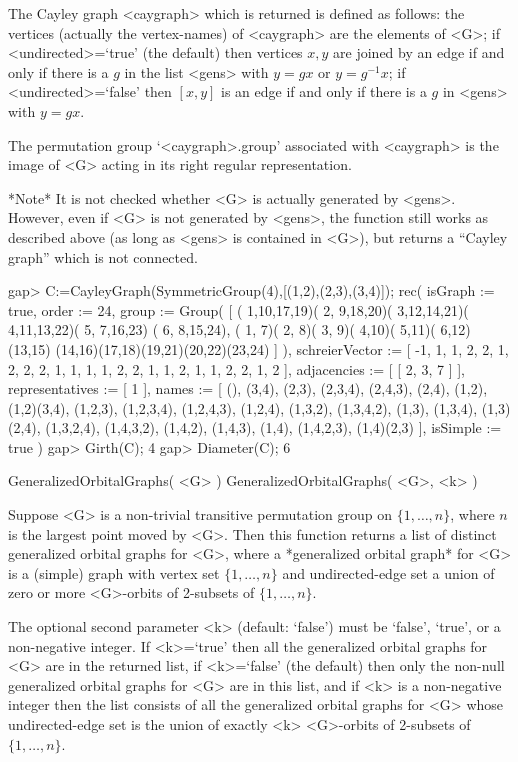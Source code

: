The Cayley graph  <caygraph>  which is returned is defined as follows:
the vertices (actually the vertex-names) of <caygraph>  are the elements
of <G>;  if <undirected>=`true' (the default) then vertices $x,y$ are
joined by an edge if and only if there is a $g$ in the list <gens> with
$y=gx$ or $y=g^{-1}x$; if <undirected>=`false' then $[x,y]$ is an edge
if and only if there is a $g$ in <gens> with $y=gx$.

The permutation group `<caygraph>.group' associated with <caygraph> is
the image of <G> acting in its right regular representation.

*Note* It is not checked whether <G> is actually generated by <gens>.
However, even if <G> is not generated by <gens>, the function still
works as described above (as long as <gens> is contained in <G>), but
returns a ``Cayley graph'' which is not connected.

\beginexample
gap> C:=CayleyGraph(SymmetricGroup(4),[(1,2),(2,3),(3,4)]);
rec(
  isGraph := true,
  order := 24,
  group :=
   Group( [ ( 1,10,17,19)( 2, 9,18,20)( 3,12,14,21)( 4,11,13,22)( 5, 7,16,23)
        ( 6, 8,15,24), ( 1, 7)( 2, 8)( 3, 9)( 4,10)( 5,11)( 6,12)(13,15)
        (14,16)(17,18)(19,21)(20,22)(23,24) ] ),
  schreierVector := [ -1, 1, 1, 2, 2, 1, 2, 2, 2, 1, 1, 1, 1, 2, 2, 1, 1, 2,
      1, 1, 2, 2, 1, 2 ],
  adjacencies := [ [ 2, 3, 7 ] ],
  representatives := [ 1 ],
  names := [ (), (3,4), (2,3), (2,3,4), (2,4,3), (2,4), (1,2), (1,2)(3,4),
      (1,2,3), (1,2,3,4), (1,2,4,3), (1,2,4), (1,3,2), (1,3,4,2), (1,3),
      (1,3,4), (1,3)(2,4), (1,3,2,4), (1,4,3,2), (1,4,2), (1,4,3), (1,4),
      (1,4,2,3), (1,4)(2,3) ],
  isSimple := true )
gap> Girth(C);
4
gap> Diameter(C);
6
\endexample


\>GeneralizedOrbitalGraphs( <G> )
\>GeneralizedOrbitalGraphs( <G>, <k> )

Suppose <G> is a non-trivial transitive permutation group
on $\{1,\ldots,n\}$, where $n$ is the largest point moved by <G>.
Then this function returns a list of distinct generalized
orbital graphs for <G>, where a  *generalized orbital graph*
for <G>  is a (simple) graph with vertex set $\{1,\ldots,n\}$ and
undirected-edge set a union of zero or more <G>-orbits of 2-subsets
of $\{1,\ldots,n\}$.

The optional second parameter <k> (default: `false') must be `false',
`true', or a non-negative integer. If <k>=`true' then all the generalized
orbital graphs for <G> are in the returned list, if <k>=`false' (the
default) then only the non-null generalized orbital graphs for <G> are in
this list, and if <k> is a non-negative integer then the list consists
of all the generalized orbital graphs for <G> whose undirected-edge set
is the union of exactly <k> <G>-orbits of 2-subsets of $\{1,\ldots,n\}$.

